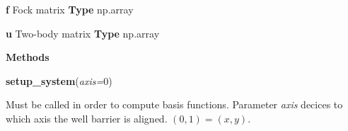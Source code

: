 \begin{tcolorbox}
{    \hspace{2em} \textbf{f}
    Fock matrix
    \textbf{Type} np.array

    \hspace{2em} \textbf{u}
    Two-body matrix
    \textbf{Type} np.array

    \vspace{1em}
    \textbf{Methods}

    \hspace{2em} \textbf{setup\_system}(\emph{axis=$0$})
        \begin{adjustwidth}{4em}{}
        Must be called in order to compute basis functions. Parameter \emph{axis}
        decices to which axis the well barrier is aligned. $(0,1) = (x,y)$.           
        \end{adjustwidth}
    }
\end{tcolorbox}
